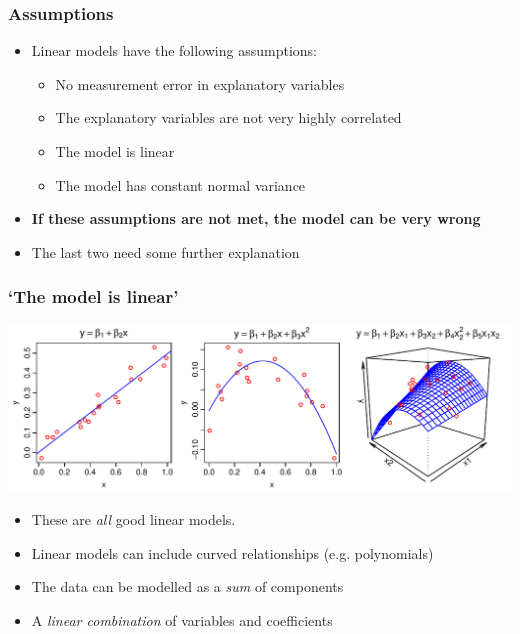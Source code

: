 \documentclass[aspectratio=43]{beamer}
\begin{document}
\frame
{\frametitle{Assumptions}

\begin{itemize}\itemsep20pt
\item Linear models have the following assumptions:
\begin{itemize}
\item No measurement error in explanatory variables
\item The explanatory variables are not very highly correlated
\item {} The model is linear
\item {} The model has constant normal variance
\end{itemize}
\item {\bf If these assumptions are not met, the model can be very wrong}
\item<2> The last two need some further explanation
\end{itemize}

}

\begin{frame}[T]
\frametitle{`The model is linear'}

\includegraphics[width=\textwidth]{Linear.pdf}

\begin{itemize}
\item These are {\it all} good linear models.
\item Linear models can include curved relationships (e.g. polynomials)
\item The data can be modelled as a {\it sum} of components
\item A {\it linear combination} of variables and coefficients
\end{itemize}

\end{frame}
\end{document}
